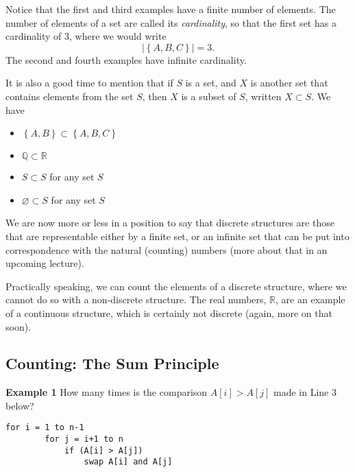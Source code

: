 \documentclass[12pt, letterpaper]{article}
\theoremstyle{definition}
\begin{document}
Notice that the first and third examples have a finite number of elements.
The number of elements of a set are called its \emph{cardinality}, so that
the first set has a cardinality of 3, where we would write
\begin{equation*}
    \left|\left\{ A, B, C \right\}\right| = 3.
\end{equation*}
The second and fourth examples have infinite cardinality.

It is also a good time to mention that if $S$ is a set, and $X$ is another set
that contains elements from the set $S$, then $X$ is a subset of $S$, written
$X \subset S$. We have

\begin{itemize}[label={}]
    \item $\left\{ A, B \right\} \subset \left\{ A, B, C \right\}$
    \item $\mathbb{Q} \subset \mathbb{R}$
    \item $S \subset S$ for any set $S$
    \item $\varnothing \subset S$ for any set $S$
\end{itemize}

We are now more or less in a position to say that discrete structures are those
that are representable either by a finite set, or an infinite set that can be
put into correspondence with the natural (counting) numbers (more about that in
an upcoming lecture).

Practically speaking, we can count the elements of a discrete structure, where
we cannot do so with a non-discrete structure. The real numbers, $\mathbb{R}$,
are an example of a continuous structure, which is certainly not discrete
(again, more on that soon).

\clearpage\pagebreak\noindent
\subsection*{Counting: The Sum Principle}
\noindent
\textbf{Example 1}
How many times is the comparison $A[i] > A[j]$ made in Line 3 below?

\begin{center}
    \begin{lstlisting}[label=ex1a, caption={Example 1}]
    for i = 1 to n-1
        for j = i+1 to n
            if (A[i] > A[j])
                swap A[i] and A[j]
    \end{lstlisting}
\end{center}

\clearpage\pagebreak\noindent
\end{document}

